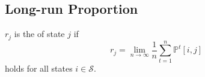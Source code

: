 \subsection{Long-run Proportion}

\begin{definition}
$ r_{j} $ is the  of state $ j $ if
\[ r_{j} = \lim_{n \to \infty} \frac{1}{n} \sum_{t = 1}^{n} \mathbb{P}^{t}[i, j] \]
holds for all states $ i \in \mathcal{S} $.

\begin{comment}
Why this name?

Suppose $ N $ is a uniform distribution over $ \{ 1, \cdots, n \} $. The ``long-run proportion of state $ j $'' is
\begin{eqnarray*}
  &   & \lim_{n \to \infty} P(X(N) = j \mid X(0) = i) \\
  & = & \lim_{n \to \infty} P(X(N) = j \mid N = t, X(0) = i) \cdot P(N = t \mid X(0) = i) \\
  & = & \lim_{n \to \infty} P(X(N) = j \mid X(0) = i) \cdot \frac{1}{n} \\
  & = & \lim_{n \to \infty} \frac{1}{n} \sum_{t = 1}^{n} \mathbb{P}^{t}[i, j]
\end{eqnarray*}

(Proportion：state 在 t 時間內出現的比例有多高。)
\end{comment}
\end{definition}

